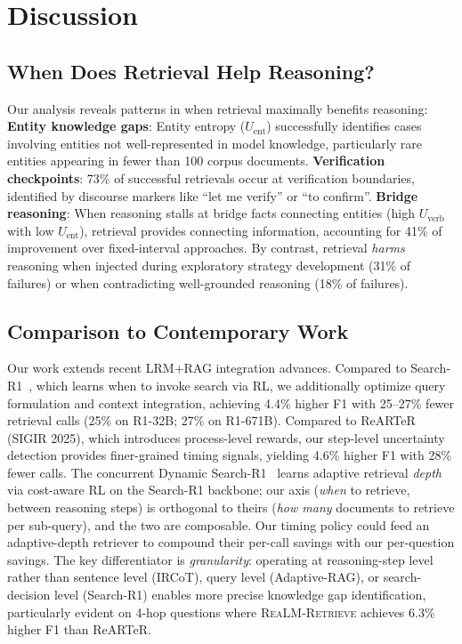 \documentclass[sigconf,natbib=true]{acmart}
\newcommand{\methodname}{\textsc{ReaLM-Retrieve}}
\begin{document}
\section{Discussion}
\label{sec:discussion}

\subsection{When Does Retrieval Help Reasoning?}
Our analysis reveals patterns in when retrieval maximally benefits reasoning: \textbf{Entity knowledge gaps}: Entity entropy ($U_{\text{ent}}$) successfully identifies cases involving entities not well-represented in model knowledge, particularly rare entities appearing in fewer than 100 corpus documents. \textbf{Verification checkpoints}: 73\% of successful retrievals occur at verification boundaries, identified by discourse markers like ``let me verify'' or ``to confirm''. \textbf{Bridge reasoning}: When reasoning stalls at bridge facts connecting entities (high $U_{\text{verb}}$ with low $U_{\text{ent}}$), retrieval provides connecting information, accounting for 41\% of improvement over fixed-interval approaches. By contrast, retrieval \emph{harms} reasoning when injected during exploratory strategy development (31\% of failures) or when contradicting well-grounded reasoning (18\% of failures).

\subsection{Comparison to Contemporary Work}
Our work extends recent LRM+RAG integration advances. Compared to Search-R1~\cite{jin2025searchr1}, which learns when to invoke search via RL, we additionally optimize query formulation and context integration, achieving 4.4\% higher F1 with 25--27\% fewer retrieval calls (25\% on R1-32B; 27\% on R1-671B). Compared to ReARTeR~\cite{sun2025rearter} (SIGIR 2025), which introduces process-level rewards, our step-level uncertainty detection provides finer-grained timing signals, yielding 4.6\% higher F1 with 28\% fewer calls. The concurrent Dynamic Search-R1~\cite{hashemi2026costaware} learns adaptive retrieval \emph{depth} via cost-aware RL on the Search-R1 backbone; our axis (\emph{when} to retrieve, between reasoning steps) is orthogonal to theirs (\emph{how many} documents to retrieve per sub-query), and the two are composable. Our timing policy could feed an adaptive-depth retriever to compound their per-call savings with our per-question savings. The key differentiator is \emph{granularity}: operating at reasoning-step level rather than sentence level (IRCoT), query level (Adaptive-RAG), or search-decision level (Search-R1) enables more precise knowledge gap identification, particularly evident on 4-hop questions where \methodname{} achieves 6.3\% higher F1 than ReARTeR.
\end{document}
